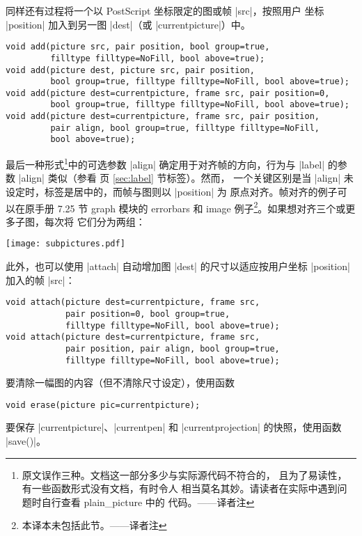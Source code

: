 \documentclass[nofonts,CJKnormalspaces]{ctexbook}[2009/05/20]
\makeatletter
\newenvironment{typelist}{\itemize
  \let\old@item\@item
  \def\@item[##1]{\expandafter\old@item[\ttfamily\color{type!50!black}##1]}}
{\enditemize}
\newcommand*\prgname[1]{\textsf{#1}}
\newcommand\transnote[1]{\footnote{#1——译者注}}
\makeatother
\begin{document}
\begin{typelist}
同样还有过程将一个以 \prgname{PostScript} 坐标限定的图或帧 |src|，按照用户
坐标 |position| 加入到另一图 |dest|（或 |currentpicture|）中。
\begin{lstlisting}
void add(picture src, pair position, bool group=true,
         filltype filltype=NoFill, bool above=true);
void add(picture dest, picture src, pair position,
         bool group=true, filltype filltype=NoFill, bool above=true);
void add(picture dest=currentpicture, frame src, pair position=0,
         bool group=true, filltype filltype=NoFill, bool above=true);
void add(picture dest=currentpicture, frame src, pair position,
         pair align, bool group=true, filltype filltype=NoFill,
         bool above=true);
\end{lstlisting}
最后一种形式\transnote{原文误作三种。文档这一部分多少与实际源代码不符合的，
且为了易读性，有一些函数形式没有文档，有时令人
相当莫名其妙。请读者在实际中遇到问题时自行查看 \prgname{plain\_picture} 中的
代码。}中的可选参数 |align| 确定用于对齐帧的方向，行为与 |label| 的参数
|align| 类似（参看 \pageref{sec:label} 页 \ref{sec:label} 节标签）。然而，
一个关键区别是当 |align| 未设定时，标签是居中的，而帧与图则以 |position| 为
原点对齐。帧对齐的例子可以在原手册 7.25 节 \prgname{graph} 模块的 errorbars
和 image 例子\transnote{本译本未包括此节。}。如果想对齐三个或更多子图，每次将
它们分为两组：

\begin{center}
  \texttt{[image: subpictures.pdf]}
\end{center}

此外，也可以使用 |attach| 自动增加图 |dest| 的尺寸以适应按用户坐标 |position|
加入的帧 |src|：
\begin{lstlisting}
void attach(picture dest=currentpicture, frame src,
            pair position=0, bool group=true,
            filltype filltype=NoFill, bool above=true);
void attach(picture dest=currentpicture, frame src,
            pair position, pair align, bool group=true,
            filltype filltype=NoFill, bool above=true);
\end{lstlisting}

要清除一幅图的内容（但不清除尺寸设定），使用函数
\begin{lstlisting}
void erase(picture pic=currentpicture);
\end{lstlisting}

要保存 |currentpicture|、|currentpen| 和 |currentprojection| 的快照，使用函数
|save()|。


\end{typelist}
\end{document}
